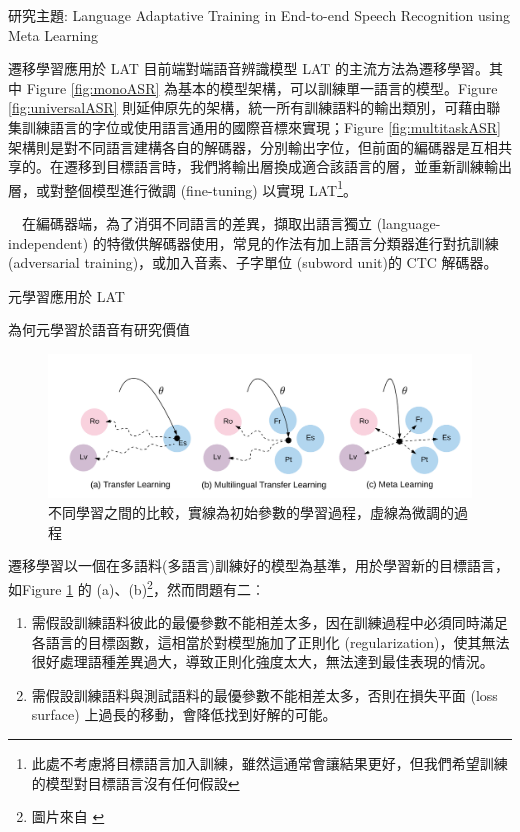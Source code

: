 \documentclass[12pt,UTF8,fntef]{article}
\begin{document}
\begin{section}{研究主題: Language Adaptative Training in End-to-end Speech Recognition using Meta Learning}
\begin{subsection}{遷移學習應用於 LAT}
  目前端對端語音辨識模型 LAT 的主流方法為遷移學習。其中 Figure \ref{fig:monoASR} 為基本的模型架構，可以訓練單一語言的模型。Figure \ref{fig:universalASR} 則延伸原先的架構，統一所有訓練語料的輸出類別，可藉由聯集訓練語言的字位或使用語言通用的國際音標來實現；Figure \ref{fig:multitaskASR} 架構則是對不同語言建構各自的解碼器，分別輸出字位，但前面的編碼器是互相共享的。在遷移到目標語言時，我們將輸出層換成適合該語言的層，並重新訓練輸出層，或對整個模型進行微調 (fine-tuning) 以實現 LAT\footnote{此處不考慮將目標語言加入訓練，雖然這通常會讓結果更好，但我們希望訓練的模型對目標語言沒有任何假設}。

~~在編碼器端，為了消弭不同語言的差異，擷取出語言獨立 (language-independent) 的特徵供解碼器使用，常見的作法有加上語言分類器進行對抗訓練 (adversarial training)，或加入音素、子字單位 (subword unit)的 CTC 解碼器。
  \end{subsection}

  \begin{subsection}{元學習應用於 LAT}
    \begin{subsubsection}{為何元學習於語音有研究價值}

  \begin{figure}[ht]
      \centering
      \includegraphics[width=0.8\linewidth]{Meta-motivation.png}
      \caption{不同學習之間的比較，實線為初始參數的學習過程，虛線為微調的過程}
      \label{fig:motivation}
  \end{figure}

  遷移學習以一個在多語料(多語言)訓練好的模型為基準，用於學習新的目標語言，如Figure \ref{fig:motivation} 的 (a)、(b)\footnote{圖片來自 \cite{gu2018meta}}，然而問題有二︰
      \begin{enumerate}[itemsep=-1mm]
        \item 需假設訓練語料彼此的最優參數不能相差太多，因在訓練過程中必須同時滿足各語言的目標函數，這相當於對模型施加了正則化 (regularization)，使其無法很好處理語種差異過大，導致正則化強度太大，無法達到最佳表現的情況。
        \item 需假設訓練語料與測試語料的最優參數不能相差太多，否則在損失平面 (loss surface) 上過長的移動，會降低找到好解的可能。 
      \end{enumerate}


\end{subsubsection}
\end{subsection}
\end{section}
\end{document}
